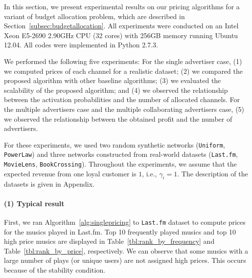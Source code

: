 \documentclass[letterpaper]{article}
\theoremstyle{definition}
\begin{document}
In this section, we present experimental results on our pricing algorithms
for a variant of budget allocation problem, which are described in Section~\ref{subsec:budgetallocation}.
%
All experiments were conducted on an Intel Xeon E5-2690
2.90GHz CPU (32 cores) with 256GB memory running Ubuntu 12.04.
All codes were implemented in Python 2.7.3.

We performed the following five experiments:
For the single advertiser case,
(1) we computed prices of each channel for a realistic dataset;
(2) we compared the proposed algorithm with other baseline algorithms;
(3) we evaluated the scalability of the proposed algorithm; and
(4) we observed the relationship between the activation probabilities and the number of allocated channels. %
For the multiple advertisers case and the multiple collaborating advertisers case,
(5) we observed the relationship between the obtained profit and the number of advertisers.



%
For these experiments, we used two random synthetic networks (\texttt{Uniform}, \texttt{PowerLaw}) and three networks constructed from real-world datasets (\texttt{Last.fm}, \texttt{MovieLens}, \texttt{BookCrossing}).
Throughout the experiments, we assume that the expected revenue from one loyal customer is $1$, i.e., $\gamma_i=1$.
The description of the datasets is given in Appendix.

\vspace{-1em}
\paragraph{(1) Typical result}

First, we ran Algorithm~\ref{alg:singlepricing}
to \texttt{Last.fm} dataset to compute prices for the musics played in Last.fm.
Top 10 frequently played musics and top 10 high price musics
are displayed in Table~\ref{tbl:rank_by_frequency} and Table~\ref{tbl:rank_by_price}, respectively.
We can observe that some musics with a large number of plays (or unique users) are not assigned high prices.
This occurs because of the stability condition.
\end{document}
